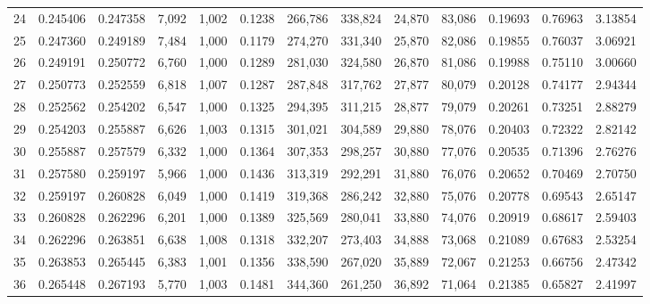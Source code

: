 \begin{tabular}{rrrrrrrrrrrrr}
24  &  0.245406 &  0.247358 &   7,092 &  1,002 &                                     0.1238 &  266,786 &  338,824 &   24,870 &   83,086 &  0.19693 &  0.76963 &  3.13854 \\
25  &  0.247360 &  0.249189 &   7,484 &  1,000 &                                     0.1179 &  274,270 &  331,340 &   25,870 &   82,086 &  0.19855 &  0.76037 &  3.06921 \\
26  &  0.249191 &  0.250772 &   6,760 &  1,000 &                                     0.1289 &  281,030 &  324,580 &   26,870 &   81,086 &  0.19988 &  0.75110 &  3.00660 \\
27  &  0.250773 &  0.252559 &   6,818 &  1,007 &                                     0.1287 &  287,848 &  317,762 &   27,877 &   80,079 &  0.20128 &  0.74177 &  2.94344 \\
28  &  0.252562 &  0.254202 &   6,547 &  1,000 &                                     0.1325 &  294,395 &  311,215 &   28,877 &   79,079 &  0.20261 &  0.73251 &  2.88279 \\
29  &  0.254203 &  0.255887 &   6,626 &  1,003 &                                     0.1315 &  301,021 &  304,589 &   29,880 &   78,076 &  0.20403 &  0.72322 &  2.82142 \\
30  &  0.255887 &  0.257579 &   6,332 &  1,000 &                                     0.1364 &  307,353 &  298,257 &   30,880 &   77,076 &  0.20535 &  0.71396 &  2.76276 \\
31  &  0.257580 &  0.259197 &   5,966 &  1,000 &                                     0.1436 &  313,319 &  292,291 &   31,880 &   76,076 &  0.20652 &  0.70469 &  2.70750 \\
32  &  0.259197 &  0.260828 &   6,049 &  1,000 &                                     0.1419 &  319,368 &  286,242 &   32,880 &   75,076 &  0.20778 &  0.69543 &  2.65147 \\
33  &  0.260828 &  0.262296 &   6,201 &  1,000 &                                     0.1389 &  325,569 &  280,041 &   33,880 &   74,076 &  0.20919 &  0.68617 &  2.59403 \\
34  &  0.262296 &  0.263851 &   6,638 &  1,008 &                                     0.1318 &  332,207 &  273,403 &   34,888 &   73,068 &  0.21089 &  0.67683 &  2.53254 \\
35  &  0.263853 &  0.265445 &   6,383 &  1,001 &                                     0.1356 &  338,590 &  267,020 &   35,889 &   72,067 &  0.21253 &  0.66756 &  2.47342 \\
36  &  0.265448 &  0.267193 &   5,770 &  1,003 &                                     0.1481 &  344,360 &  261,250 &   36,892 &   71,064 &  0.21385 &  0.65827 &  2.41997 \\

\end{tabular}
